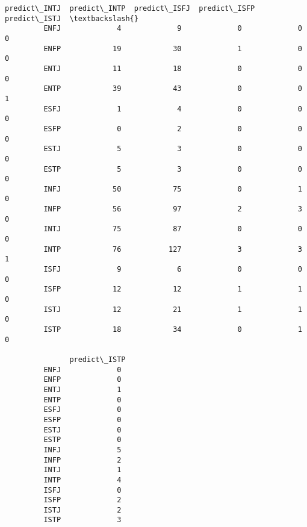 \documentclass[11pt]{article}
\begin{document}
\begin{Verbatim}[commandchars=\\\{\}]
               predict\_INTJ  predict\_INTP  predict\_ISFJ  predict\_ISFP  predict\_ISTJ  \textbackslash{}
         ENFJ             4             9             0             0             0   
         ENFP            19            30             1             0             0   
         ENTJ            11            18             0             0             0   
         ENTP            39            43             0             0             1   
         ESFJ             1             4             0             0             0   
         ESFP             0             2             0             0             0   
         ESTJ             5             3             0             0             0   
         ESTP             5             3             0             0             0   
         INFJ            50            75             0             1             0   
         INFP            56            97             2             3             0   
         INTJ            75            87             0             0             0   
         INTP            76           127             3             3             1   
         ISFJ             9             6             0             0             0   
         ISFP            12            12             1             1             0   
         ISTJ            12            21             1             1             0   
         ISTP            18            34             0             1             0   
         
               predict\_ISTP  
         ENFJ             0  
         ENFP             0  
         ENTJ             1  
         ENTP             0  
         ESFJ             0  
         ESFP             0  
         ESTJ             0  
         ESTP             0  
         INFJ             5  
         INFP             2  
         INTJ             1  
         INTP             4  
         ISFJ             0  
         ISFP             2  
         ISTJ             2  
         ISTP             3  
\end{Verbatim}
            
\end{document}
